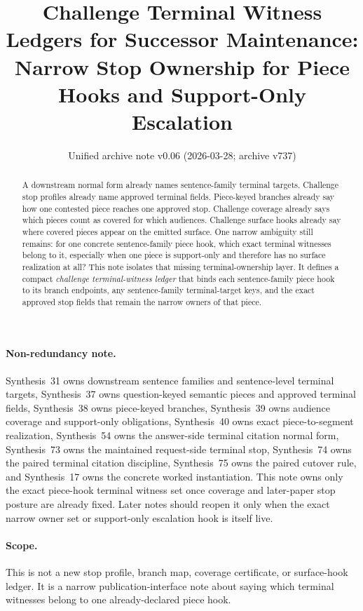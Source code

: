 \documentclass[11pt]{article}
\title{Challenge Terminal Witness Ledgers for Successor Maintenance:\\[0.5ex]
\large Narrow Stop Ownership for Piece Hooks and Support-Only Escalation}
\author{}
\date{Unified archive note v0.06 (2026-03-28; archive v737)}
\begin{document}
\maketitle

\begin{abstract}
A downstream normal form already names sentence-family terminal targets.
Challenge stop profiles already name approved terminal fields.
Piece-keyed branches already say how one contested piece reaches one approved stop.
Challenge coverage already says which pieces count as covered for which audiences.
Challenge surface hooks already say where covered pieces appear on the emitted surface.
One narrow ambiguity still remains: for one concrete sentence-family piece hook, which exact terminal witnesses belong to it, especially when one piece is support-only and therefore has no surface realization at all?
This note isolates that missing terminal-ownership layer.
It defines a compact \emph{challenge terminal-witness ledger} that binds each sentence-family piece hook to its branch endpoints, any sentence-family terminal-target keys, and the exact approved stop fields that remain the narrow owners of that piece.
\end{abstract}

\paragraph{Non-redundancy note.}
Synthesis~31 owns downstream sentence families and sentence-level terminal targets, Synthesis~37 owns question-keyed semantic pieces and approved terminal fields, Synthesis~38 owns piece-keyed branches, Synthesis~39 owns audience coverage and support-only obligations, Synthesis~40 owns exact piece-to-segment realization, Synthesis~54 owns the answer-side terminal citation normal form, Synthesis~73 owns the maintained request-side terminal stop, Synthesis~74 owns the paired terminal citation discipline, Synthesis~75 owns the paired cutover rule, and Synthesis~17 owns the concrete worked instantiation.
This note owns only the exact piece-hook terminal witness set once coverage and later-paper stop posture are already fixed. Later notes should reopen it only when the exact narrow owner set or support-only escalation hook is itself live.
\paragraph{Scope.}
This is not a new stop profile, branch map, coverage certificate, or surface-hook ledger.
It is a narrow publication-interface note about saying which terminal witnesses belong to one already-declared piece hook.
\end{document}
